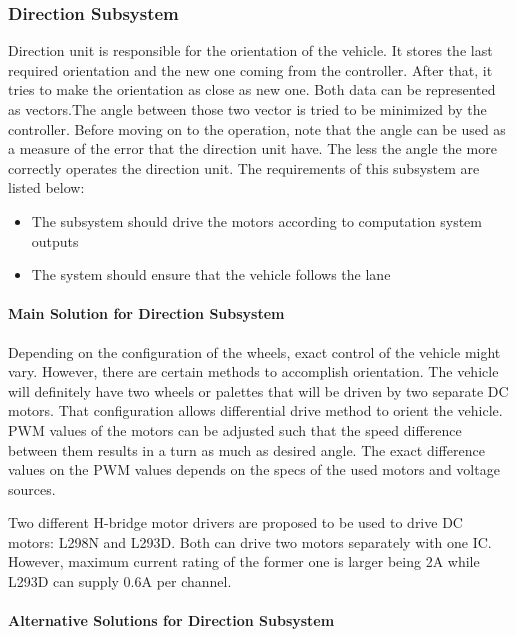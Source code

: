 \documentclass[a4paper,12pt]{article}
\begin{document}
	\subsubsection{Direction Subsystem}
	Direction unit is responsible for the orientation of the vehicle. It stores the last required orientation and the new one coming from the controller. After that, it tries to make the orientation as close as new one. Both data can be represented as vectors.The angle between those two vector is tried to be minimized by the controller. Before moving on to the operation, note that the angle can be used as a measure of the error that the direction unit have. The less the angle the more correctly operates the direction unit. The requirements of this subsystem are listed below:
	\begin{itemize}
		\item The subsystem should drive the motors according to computation system outputs
		\item The system should ensure that the vehicle follows the lane 
	\end{itemize}
	
	\paragraph{Main Solution for Direction Subsystem}
	Depending on the configuration of the wheels, exact control of the vehicle might vary. However, there are certain methods to accomplish orientation. The vehicle will definitely have two wheels or palettes that will be driven by two separate DC motors. That configuration allows differential drive method to orient the vehicle. PWM values of the motors can be adjusted such that the speed difference between them results in a turn as much as desired angle. The exact difference values on the PWM values depends on the specs of the used motors and voltage sources. 
	
	Two different H-bridge motor drivers are proposed to be used to drive DC motors: L298N and L293D. Both can drive two motors separately with one IC. However, maximum current rating of the former one is larger being 2A while L293D can supply 0.6A per channel. 
	
	
	
	
	
	\paragraph{Alternative Solutions for Direction Subsystem}
	
\end{document}
